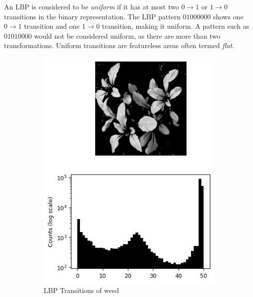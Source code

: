 \documentclass[letterpaper, notitlepage]{report}
\begin{document}
An LBP is considered to be \textit{uniform} if it has at most two $0 \rightarrow 1$ or $1 \rightarrow 0$ transitions in the binary representation. The LBP pattern $01000000$ shows one $0 \rightarrow 1$ transition and one $1 \rightarrow 0$ transition, making it uniform. A pattern such as $01010000$ would not be considered uniform, as there are more than two transformations. Uniform transitions are featureless areas often termed \textit{flat}.

%

\begin{figure}[H]
	\centering
	\begin{subfigure}{0.48\linewidth}
		\centering
		\includegraphics[scale=.7]{./figures/lbp-left.jpg}
		\caption{LBP Transitions of weed}
		\label{subfig:lbp-weed}	
	\end{subfigure}
	\hfill
	\begin{subfigure}{0.48\linewidth}
		\centering

\end{subfigure}
\end{figure}
\end{document}
